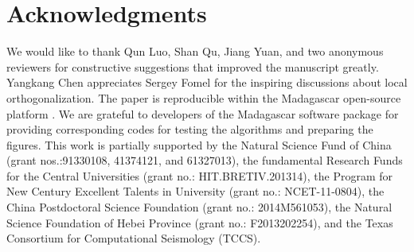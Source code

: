 \section{Acknowledgments}
We would like to thank Qun Luo, Shan Qu, Jiang Yuan, and two anonymous reviewers for constructive suggestions that improved the manuscript greatly. Yangkang Chen appreciates Sergey Fomel for the inspiring discussions about local orthogonalization. The paper is reproducible within the Madagascar open-source platform \cite{mada2013}. We are grateful to developers of the Madagascar software package for providing corresponding codes for testing the algorithms and preparing the figures. This work is partially supported by the Natural Science Fund of China (grant nos.:91330108, 41374121, and 61327013), the fundamental Research Funds for the Central Universities (grant no.: HIT.BRETIV.201314), the Program for New Century Excellent Talents in University (grant no.: NCET-11-0804), the China Postdoctoral Science Foundation (grant no.: 2014M561053), the Natural Science Foundation of Hebei Province (grant no.: F2013202254), and the Texas Consortium for Computational Seismology (TCCS).










